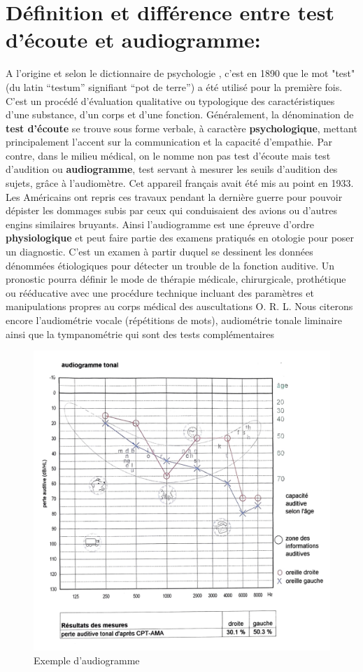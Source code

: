 \section*{Définition et différence entre test d'écoute et audiogramme: }
A l'origine et selon le dictionnaire de psychologie \autocite {doronparot}, c'est en 1890 que le mot "test" (du latin ``testum''
signifiant ``pot de terre'') a été utilisé pour la
première fois. C'est un procédé d'évaluation qualitative ou
typologique des caractéristiques d'une substance, d'un corps et d'une
fonction.
Généralement, la dénomination de \textbf{test d'écoute} se trouve sous forme verbale,
à caractère
\textbf{psychologique}, mettant principalement l'accent sur la communication
et la capacité d'empathie.
Par contre, dans le milieu médical, on le nomme non pas test d'écoute mais test d'audition ou 
\textbf{audiogramme}, test servant à mesurer les seuils d'audition des sujets, grâce à l'audiomètre. Cet
appareil français avait été mis au point en 1933. Les Américains
ont repris ces travaux pendant la dernière guerre pour pouvoir dépister
les dommages subis par ceux qui conduisaient des avions ou d'autres
engins similaires bruyants.
Ainsi l'audiogramme est une épreuve d'ordre \textbf{physiologique} et peut faire partie des examens  pratiqués en otologie
pour poser un diagnostic.
   C'est un examen à partir duquel se
  dessinent les données dénommées étiologiques
  pour détecter un trouble de la fonction auditive. Un pronostic pourra définir le mode de thérapie
médicale, chirurgicale, prothétique ou rééducative avec une procédure
technique incluant des paramètres et manipulations propres au corps
médical des auscultations O. R. L.
Nous citerons encore l'audiométrie vocale (répétitions de mots), audiométrie tonale liminaire
ainsi que la tympanométrie qui sont des tests 
complémentaires \autocite {audiogramme}

\begin{figure}
	\centering
	\includegraphics[width=0.7\linewidth]{images/graphiques/exempleaudiogramme.png}
	\caption{Exemple d'audiogramme}
\label{audiogramme}
\end{figure}

